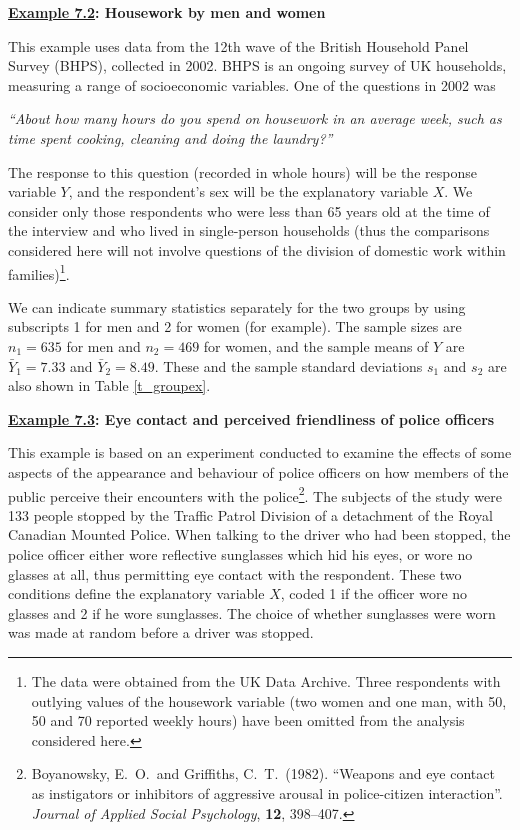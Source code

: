 \textbf{\underline{Example 7.2}: Housework by men and women}

This example uses data from the 12th wave of the British Household Panel
Survey (BHPS), collected in 2002. BHPS is an ongoing survey of UK
households, measuring a range of socioeconomic variables.
One of the questions in 2002 was

\emph{``About how many hours do you spend on housework in an average week,
such as time spent cooking, cleaning and doing the laundry?''}

The response to this question (recorded in whole hours) will be the
response variable $Y$, and the respondent's sex will be the explanatory
variable $X$. We consider only those respondents who were less than 65
years old at the time of the interview and who lived in single-person
households (thus the comparisons considered here will not involve
questions of the division of domestic work within families)\footnote{The
data were obtained from the UK Data Archive. Three respondents with
outlying values of the housework variable (two women and one man, with
50, 50 and 70 reported weekly hours) have been omitted from the analysis
considered here.}.

We can indicate summary statistics separately for the two groups by
using subscripts 1 for men and 2 for women (for example). The sample
sizes are $n_{1}=635$ for men and $n_{2}=469$ for women, and the sample
means of $Y$ are $\bar{Y}_{1}=7.33$ and $\bar{Y}_{2}=8.49$. These and
the sample standard deviations $s_{1}$ and $s_{2}$ are also shown in
Table \ref{t_groupex}.

\textbf{\underline{Example 7.3}: Eye contact and perceived friendliness of police
officers}

This example is based on an experiment conducted to examine the effects
of some aspects of the appearance and behaviour of police officers on
how members of the public perceive their encounters with the
police\footnote{Boyanowsky, E.\ O.\ and Griffiths, C.\ T.\ (1982).
``Weapons and eye contact as instigators or inhibitors of aggressive
arousal in police-citizen interaction''. \emph{Journal of Applied Social
Psychology}, \textbf{12}, 398--407.}. The subjects of
the study were 133 people stopped by the Traffic Patrol Division of a
detachment of the Royal Canadian Mounted Police. When talking to the
driver who had been stopped, the police officer either wore reflective
sunglasses which hid his eyes, or wore no glasses at all, thus
permitting eye contact with the respondent. These two conditions define
the explanatory variable $X$, coded 1 if the officer wore no glasses and
2 if he wore sunglasses. The choice of whether sunglasses were worn was
made at random before a driver was stopped.

